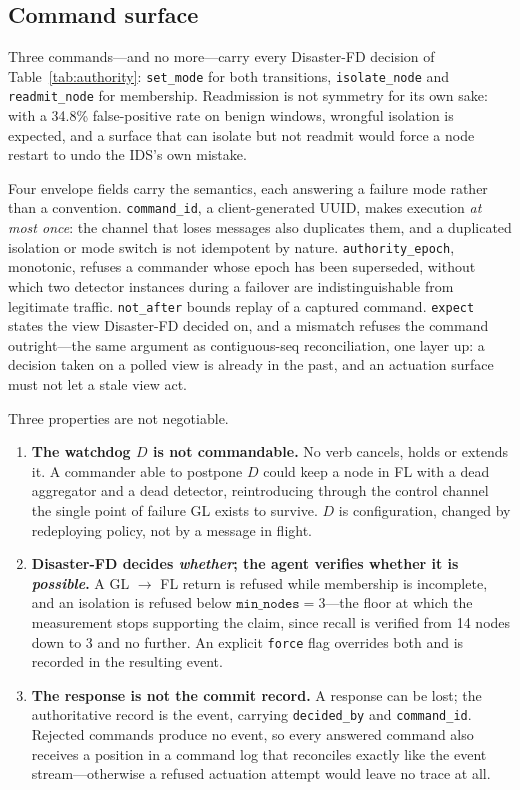 \subsection{Command surface}
\label{sec:api-commands}

Three commands---and no more---carry every Disaster-FD decision of
Table~\ref{tab:authority}: \texttt{set\_mode} for both transitions, \texttt{isolate\_node}
and \texttt{readmit\_node} for membership. Readmission is not symmetry for its own sake:
with a 34.8\% false-positive rate on benign windows, wrongful isolation is expected, and a
surface that can isolate but not readmit would force a node restart to undo the IDS's own
mistake.

Four envelope fields carry the semantics, each answering a failure mode rather than a
convention. \texttt{command\_id}, a client-generated UUID, makes execution \emph{at most
once}: the channel that loses messages also duplicates them, and a duplicated isolation or
mode switch is not idempotent by nature. \texttt{authority\_epoch}, monotonic, refuses a
commander whose epoch has been superseded, without which two detector instances during a
failover are indistinguishable from legitimate traffic. \texttt{not\_after} bounds replay of
a captured command. \texttt{expect} states the view Disaster-FD decided on, and a mismatch
refuses the command outright---the same argument as contiguous-seq reconciliation, one layer
up: a decision taken on a polled view is already in the past, and an actuation surface must
not let a stale view act.

Three properties are not negotiable.

\begin{enumerate}
\item \textbf{The watchdog $D$ is not commandable.} No verb cancels, holds or extends it. A
commander able to postpone $D$ could keep a node in FL with a dead aggregator and a dead
detector, reintroducing through the control channel the single point of failure GL exists
to survive. $D$ is configuration, changed by redeploying policy, not by a message in
flight.

\item \textbf{Disaster-FD decides \emph{whether}; the agent verifies whether it is
\emph{possible}.} A GL $\rightarrow$ FL return is refused while membership is incomplete,
and an isolation is refused below $\texttt{min\_nodes} = 3$---the floor at which the
measurement stops supporting the claim, since recall is verified from 14 nodes down to 3 and
no further. An explicit \texttt{force} flag overrides both and is recorded in the resulting
event.

\item \textbf{The response is not the commit record.} A response can be lost; the
authoritative record is the event, carrying \texttt{decided\_by} and \texttt{command\_id}.
Rejected commands produce no event, so every answered command also receives a position in a
command log that reconciles exactly like the event stream---otherwise a refused actuation
attempt would leave no trace at all.
\end{enumerate}

